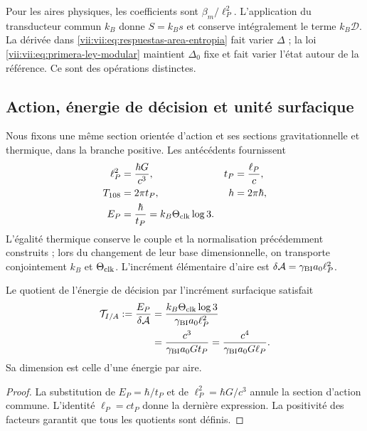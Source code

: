 Pour les aires physiques, les coefficients sont \(\beta_m/\ell_P^2\). L'application du transducteur commun \(k_B\) donne \(S=k_Bs\) et conserve intégralement le terme \(k_B\mathcal D\). La dérivée dans \eqref{vii:vii:eq:respuestas-area-entropia} fait varier \(\Delta\) ; la loi \eqref{vii:vii:eq:primera-ley-modular} maintient \(\Delta_0\) fixe et fait varier l'état autour de la référence. Ce sont des opérations distinctes.

\subsection{Action, énergie de décision et unité surfacique}
\label{vii:vii:subsec:conversion-informacion-area}

Nous fixons une même section orientée d'action et ses sections gravitationnelle et thermique, dans la branche positive. Les antécédents fournissent
\begin{equation}
 \begin{aligned}
 \ell_P^2&=\frac{\hbar G}{c^3},& t_P&=\frac{\ell_P}{c},\\
 T_{108}&=2\pi t_P,& h&=2\pi\hbar,\\
 E_P&=\frac{\hbar}{t_P}=k_B\Theta_{\rm clk}\log3.&&
 \end{aligned}
 \label{vii:vii:eq:unidad-accion-informacion}
\end{equation}
L'égalité thermique conserve le couple et la normalisation précédemment
construits ; lors du changement de leur base dimensionnelle, on transporte conjointement
\(k_B\) et \(\Theta_{\rm clk}\). L'incrément élémentaire d'aire est
\(\delta\mathcal A=\gamma_{\rm BI}a_0\ell_P^2\).

\begin{proposition}
\label{vii:vii:prop:tension-informacion-area}
Le quotient de l'énergie de décision par l'incrément surfacique satisfait
\begin{equation}
 \begin{aligned}
 \mathcal T_{I/A}:=\frac{E_P}{\delta\mathcal A}
 &=\frac{k_B\Theta_{\rm clk}\log3}{\gamma_{\rm BI}a_0\ell_P^2}\\
 &=\frac{c^3}{\gamma_{\rm BI}a_0G t_P}
  =\frac{c^4}{\gamma_{\rm BI}a_0G\ell_P}.
 \end{aligned}
 \label{vii:vii:eq:tension-informacion-area}
\end{equation}
Sa dimension est celle d'une énergie par aire.
\end{proposition}
\begin{proof}
La substitution de \(E_P=\hbar/t_P\) et de
\(\ell_P^2=\hbar G/c^3\) annule la section d'action commune.
L'identité \(\ell_P=ct_P\) donne la dernière expression. La positivité
des facteurs garantit que tous les quotients sont définis.
\end{proof}

